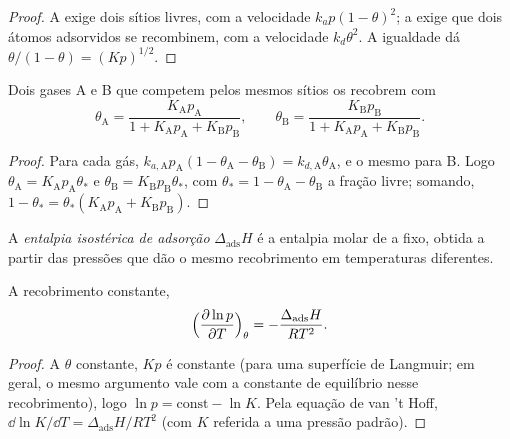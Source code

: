 \begin{proof}
A  exige dois sítios livres, com a velocidade $k_ap(1 - \theta)^2$; a  exige
que dois átomos adsorvidos se recombinem, com a velocidade $k_d\theta^2$. A igualdade dá $\theta/(1 - \theta) =
(Kp)^{1/2}$.
\end{proof}

\begin{proposition}\label{prop:b3:surfaces-catalysis:competitive}
Dois gases A e B que competem pelos mesmos sítios os recobrem com
\[
  \theta_{\mathrm A} = \frac{K_{\mathrm A}p_{\mathrm A}}{1 + K_{\mathrm A}p_{\mathrm A} + K_{\mathrm B}p_{\mathrm B}}, \qquad
  \theta_{\mathrm B} = \frac{K_{\mathrm B}p_{\mathrm B}}{1 + K_{\mathrm A}p_{\mathrm A} + K_{\mathrm B}p_{\mathrm B}} .
\]
\end{proposition}

\begin{proof}
Para cada gás, $k_{a,\mathrm A}p_{\mathrm A}(1 - \theta_{\mathrm A} - \theta_{\mathrm B}) = k_{d,\mathrm A}\theta_{\mathrm A}$, e o mesmo para B. Logo
$\theta_{\mathrm A} = K_{\mathrm A}p_{\mathrm A}\theta_\ast$ e $\theta_{\mathrm B} = K_{\mathrm B}p_{\mathrm B}\theta_\ast$, com $\theta_\ast = 1 - \theta_{\mathrm A} - \theta_{\mathrm B}$ a fração livre; somando,
$1 - \theta_\ast = \theta_\ast(K_{\mathrm A}p_{\mathrm A} + K_{\mathrm B}p_{\mathrm B})$.
\end{proof}

\begin{definition}\label{def:b3:surfaces-catalysis:isosteric}
A \emph{entalpia isostérica de adsorção}
$\Delta_{\mathrm{ads}}H$ é a entalpia molar de  a  fixo,
obtida a partir das pressões que dão o mesmo recobrimento em temperaturas
diferentes.
\end{definition}

\begin{proposition}\label{prop:b3:surfaces-catalysis:isosteric}
A recobrimento constante,
\[
  \Bigl(\frac{\partial\ln p}{\partial T}\Bigr)_\theta = -\frac{\Delta_{\mathrm{ads}}H}{RT^2} .
\]
\end{proposition}

\begin{proof}
A $\theta$ constante, $Kp$ é constante (para uma superfície de Langmuir; em geral, o mesmo
argumento vale com a constante de equilíbrio nesse recobrimento), logo $\ln p =
\text{const} - \ln K$. Pela equação de van 't Hoff, $\dd\ln K/\dd T = \Delta_{\mathrm{ads}}H/RT^2$ (com $K$
referida a uma pressão padrão).
\end{proof}

